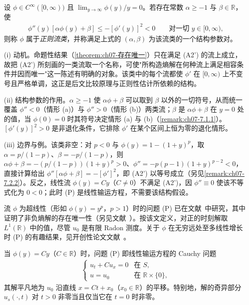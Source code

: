 ﻿\documentclass[../../main.tex]{subfiles}%
\begin{document}
\begin{definition}[正则流类]\label{definition:ch07-流类}
设 $\phi\in C^\infty([0,\infty))$ 且 $\lim_{y\to\infty}\phi(y)/y=0$。若存在常数 $\alpha\geqslant-1$ 与 $\beta\in\mathbb{R}$，使
\begin{align*}
\phi''(y)[\alpha\phi(y)+\beta]\leqslant-[\phi'(y)]^2<0\qquad\text{对一切 }y\in[0,\infty),
\end{align*}
则称 $\phi$ 属于\emph{正则流类}，并称满足上式的 $(\alpha,\beta)$ 为该流类的一个结构参数对。
\end{definition}

\begin{remark}\label{remark:ch07-流类动机}
(i) 动机。命题性结果（\cref{theorem:ch07-存在唯一}）只在满足 (A2') 的流上成立，故把 (A2') 所刻画的一类流取一个名称，可使"所构造熵解在何种流上满足相容条件并因而唯一"这一陈述有明确的对象。该类中的每个流都使 $\phi'$ 在 $[0,\infty)$ 上不变号且严格单调，这正是后文比较原理与正则性估计所依赖的结构。

(ii) 结构参数的作用。$\alpha\geqslant-1$ 使 $\alpha\phi+\beta$ 可以取到 $\beta$ 以外的一切符号，从而统一覆盖 $\phi''<0$（情形 (a)）与 $\phi''>0$（情形 (b)）两类流；$\beta$ 是 $\alpha\phi+\beta$ 在 $y=0$ 处的值，当 $\phi(0)=0$ 时其符号决定情形 (a) 与 (b)（\cref{remark:ch07-7.1.1}）。$[\phi'(y)]^2>0$ 是非退化条件，它排除 $\phi'$ 在某个区间上恒为零的退化情形。

(iii) 边界与例。该类非空：对 $p<0$ 与 $\phi(y)=1-(1+y)^p$，取 $\alpha=p/(1-p)$、$\beta=-p/(1-p)$，则 $\alpha\phi+\beta=-(p/(1-p))(1+y)^p>0$、$\phi''=-p(p-1)(1+y)^{p-2}<0$，直接计算给出 $\phi''[\alpha\phi+\beta]=-[\phi']^2$，即 (A2') 以等号成立（另见\cref{remark:ch07-7.2.2}）。反之，线性流 $\phi(y)=Cy$（$C\neq0$）不满足 (A2')，因 $\phi''\equiv0$ 使该不等式化为 $0<0$；此时 (P) 是线性输运方程，不需要该结构假设。
\end{remark}

流 $\phi$ 为超线性（形如 $\phi(y)=y^p$，$p>1$）时的问题 (P) 已在文献~\cite{ref67}中研究，其中证明了非负熵解的存在唯一性（另见文献~\cite{ref33}）。按该文定义，对正的时刻解取 $L^1(\mathbb{R})$ 中的值，尽管 $u_0$ 是有限 Radon 测度。关于 $\phi$ 在无穷远处至多线性增长时 (P) 的有趣结果，见开创性论文文献~\cite{ref39}。

当 $\phi(y)=Cy$（$C\in\mathbb{R}$）时，问题 (P) 即线性输运方程的 Cauchy 问题
\begin{align*}
\begin{cases}
u_t+Cu_x=0 & \text{在 }S,\\
u=u_0 & \text{在 }\mathbb{R}\times\{0\},
\end{cases}
\end{align*}
其解平凡地为 $u_0$ 沿直线 $x=Ct+x_0$（$x_0\in\mathbb{R}$）的平移。特别地，解的奇异部分 $u_s(\cdot,t)$ 对 $t>0$ 非零当且仅当它在 $t=0$ 时非零。
\end{document}
